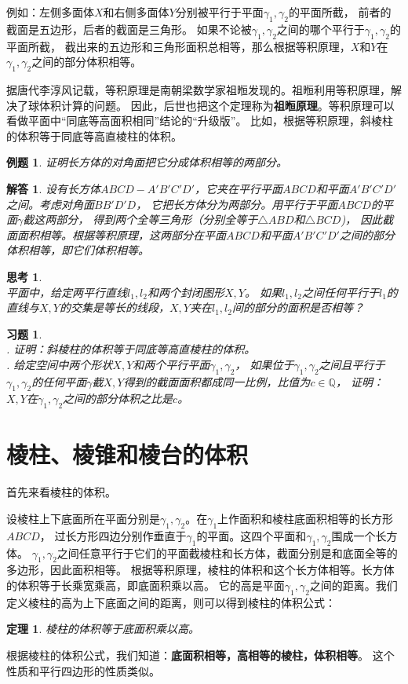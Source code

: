 \documentclass[12pt,UTF8]{ctexbook}
\newtheorem{tm}{定理}[section]
\newtheorem{et}{例题}[section]
\newtheorem{sk}{思考}[section]
\newtheorem*{so}{解答}
\newtheorem{xt}{习题}[section]
\begin{document}
例如：左侧多面体$X$和右侧多面体$Y$分别被平行于平面$\gamma_1,\gamma_2$的平面所截，
前者的截面是五边形，后者的截面是三角形。
如果不论被$\gamma_1,\gamma_2$之间的哪个平行于$\gamma_1,\gamma_2$的平面所截，
截出来的五边形和三角形面积总相等，那么根据等积原理，$X$和$Y$在$\gamma_1,\gamma_2$之间的部分体积相等。

据唐代李淳风记载，等积原理是南朝梁数学家祖暅发现的。祖暅利用等积原理，解决了球体积计算的问题。
因此，后世也把这个定理称为\textbf{祖暅原理}。等积原理可以看做平面中“同底等高面积相同”结论的“升级版”。
比如，根据等积原理，斜棱柱的体积等于同底等高直棱柱的体积。
\begin{et}
    证明长方体的对角面把它分成体积相等的两部分。
\end{et}
\begin{so}
    设有长方体$ABCD-A'B'C'D'$，它夹在平行平面$ABCD$和平面$A'B'C'D'$之间。考虑对角面$BB'D'D$，
    它把长方体分为两部分。用平行于平面$ABCD$的平面$\gamma$截这两部分，
    得到两个全等三角形（分别全等于$\triangle ABD$和$\triangle BCD$)，
    因此截面面积相等。根据等积原理，这两部分在平面$ABCD$和平面$A'B'C'D'$之间的部分体积相等，即它们体积相等。
\end{so}
\begin{sk}
    \mbox{}\\
    平面中，给定两平行直线$l_1,l_2$和两个封闭图形$X,Y$。
    如果$l_1,l_2$之间任何平行于$l_1$的直线与$X,Y$的交集是等长的线段，$X,Y$夹在$l_1,l_2$间的部分的面积是否相等？
\end{sk}
\begin{xt}
    \mbox{}\\
    . 证明：斜棱柱的体积等于同底等高直棱柱的体积。\\
    . 给定空间中两个形状$X,Y$和两个平行平面$\gamma_1,\gamma_2$，
    如果位于$\gamma_1,\gamma_2$之间且平行于$\gamma_1,\gamma_2$的任何平面$\gamma$截$X,Y$得到的截面面积都成同一比例，比值为$c\in\mathbb{Q}$，
    证明：$X,Y$在$\gamma_1,\gamma_2$之间的部分体积之比是$c$。
\end{xt}

\section{棱柱、棱锥和棱台的体积}

首先来看棱柱的体积。

设棱柱上下底面所在平面分别是$\gamma_1,\gamma_2$。在$\gamma_1$上作面积和棱柱底面积相等的长方形$ABCD$，
过长方形四边分别作垂直于$\gamma_1$的平面。这四个平面和$\gamma_1,\gamma_2$围成一个长方体。
$\gamma_1,\gamma_2$之间任意平行于它们的平面截棱柱和长方体，截面分别是和底面全等的多边形，因此面积相等。
根据等积原理，棱柱的体积和这个长方体相等。长方体的体积等于长乘宽乘高，即底面积乘以高。
它的高是平面$\gamma_1,\gamma_2$之间的距离。我们定义棱柱的高为上下底面之间的距离，则可以得到棱柱的体积公式：
\begin{tm}\label{tm:3-2-0}
    棱柱的体积等于底面积乘以高。
\end{tm}
根据棱柱的体积公式，我们知道：\textbf{底面积相等，高相等的棱柱，体积相等}。
这个性质和平行四边形的性质类似。
\end{document}
